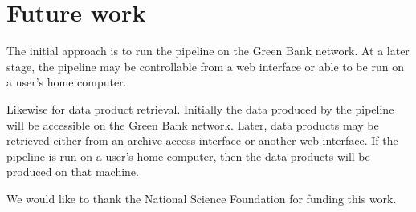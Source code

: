 \section{Future work}

The initial approach is to run the pipeline on the Green Bank network.  At a later stage, the pipeline may be controllable from a web interface or able to be run on a user's home computer.

Likewise for data product retrieval.  Initially the data produced by the pipeline will be accessible on the Green Bank network.  Later, data products may be retrieved either from an archive access interface or another web interface.  If the pipeline is run on a user's home computer, then the data products will be produced on that machine.

\acknowledgements We would like to thank the National Science Foundation for funding this work.


